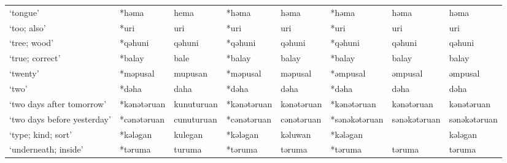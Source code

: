 \begin{landscape}
\begin{longtable}[c]{@{}p{3cm}<{\raggedright}p{2.75cm}<{\raggedright}p{2.75cm}<{\raggedright}p{2.75cm}<{\raggedright}p{2.75cm}<{\raggedright}p{2.75cm}<{\raggedright}p{2.75cm}<{\raggedright}p{2.75cm}<{\raggedright}@{}}
`tongue'                                             & *həma              & hema                           & *həma              & həma                       & *həma            & həma                     & həma                              \\
`too; also'                                          & *uri               & uri                            & *uri               & uri                        & *uri             & uri                      & uri                               \\
`tree; wood'                                         & *qəhuni            & qəhuni                         & *qəhuni            & qəhuni                     & *qəhuni          & qəhuni                   & qəhuni                            \\
`true; correct'                                      & *balay             & bale                           & *balay             & balay                      & *balay           & balay                    & balay                             \\
`twenty'                                             & *məpusal           & mupusan                        & *məpusal           & məpusal                    & *əmpusal         & əmpusal                  & əmpusal                           \\
`two'                                                & *dəha              & daha                           & *dəha              & dəha                       & *dəha            & dəha                     & dəha                              \\
`two days after tomorrow'                            & *kənətəruan        & kunuturuan                     & *kənətəruan        & kənətəruan                 & *kənətəruan      & kənətəruan               & kənətəruan                        \\
`two days before yesterday'                          & *cənətəruan        & cunuturuan                     & *cənətəruan        & cənətəruan                 & *sənəkətəruan    & sənəkətəruan             & sənəkətəruan                      \\
`type; kind; sort'                                   & *kələgan           & kulegan                        & *kələgan           & kəluwan                    & *kələgan         &                          & kələgan                           \\
`underneath; inside'                                 & *təruma            & turuma                         & *təruma            & təruma                     & *təruma          & təruma                   & təruma                            \\

\end{longtable}
\end{landscape}
